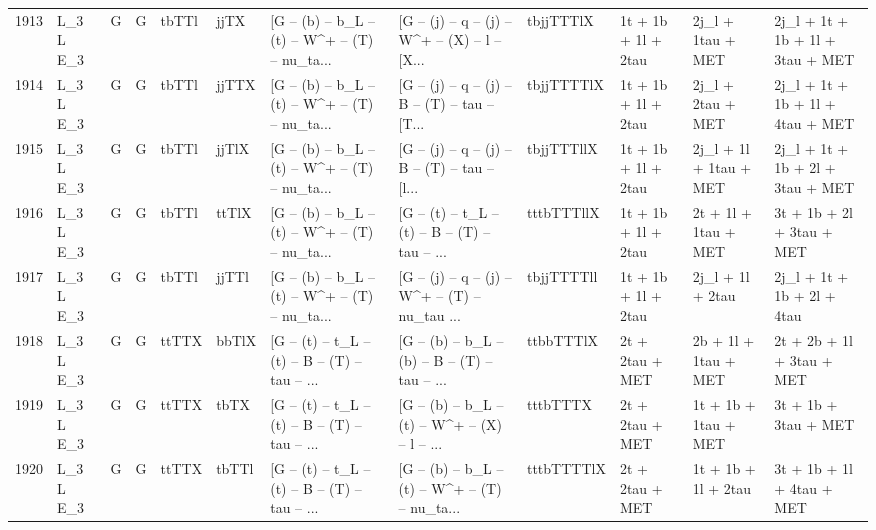 \begin{tabular}{llllllllllll}
1913 &    L\_3 L E\_3 &     G &     G &       tbTTl &        jjTX &  [G -- (b) -- b\_L -- (t) -- W\textasciicircum + -- (T) -- nu\_ta... &  [G -- (j) -- q -- (j) -- W\textasciicircum + -- (X) -- l -- [X... &   tbjjTTTlX &      1t + 1b + 1l + 2tau &        2j\_l + 1tau + MET &   2j\_l + 1t + 1b + 1l + 3tau + MET \\
1914 &    L\_3 L E\_3 &     G &     G &       tbTTl &       jjTTX &  [G -- (b) -- b\_L -- (t) -- W\textasciicircum + -- (T) -- nu\_ta... &  [G -- (j) -- q -- (j) -- B -- (T) -- tau -- [T... &  tbjjTTTTlX &      1t + 1b + 1l + 2tau &        2j\_l + 2tau + MET &   2j\_l + 1t + 1b + 1l + 4tau + MET \\
1915 &    L\_3 L E\_3 &     G &     G &       tbTTl &       jjTlX &  [G -- (b) -- b\_L -- (t) -- W\textasciicircum + -- (T) -- nu\_ta... &  [G -- (j) -- q -- (j) -- B -- (T) -- tau -- [l... &  tbjjTTTllX &      1t + 1b + 1l + 2tau &   2j\_l + 1l + 1tau + MET &   2j\_l + 1t + 1b + 2l + 3tau + MET \\
1916 &    L\_3 L E\_3 &     G &     G &       tbTTl &       ttTlX &  [G -- (b) -- b\_L -- (t) -- W\textasciicircum + -- (T) -- nu\_ta... &  [G -- (t) -- t\_L -- (t) -- B -- (T) -- tau -- ... &  tttbTTTllX &      1t + 1b + 1l + 2tau &     2t + 1l + 1tau + MET &          3t + 1b + 2l + 3tau + MET \\
1917 &    L\_3 L E\_3 &     G &     G &       tbTTl &       jjTTl &  [G -- (b) -- b\_L -- (t) -- W\textasciicircum + -- (T) -- nu\_ta... &  [G -- (j) -- q -- (j) -- W\textasciicircum + -- (T) -- nu\_tau ... &  tbjjTTTTll &      1t + 1b + 1l + 2tau &         2j\_l + 1l + 2tau &         2j\_l + 1t + 1b + 2l + 4tau \\
1918 &    L\_3 L E\_3 &     G &     G &       ttTTX &       bbTlX &  [G -- (t) -- t\_L -- (t) -- B -- (T) -- tau -- ... &  [G -- (b) -- b\_L -- (b) -- B -- (T) -- tau -- ... &   ttbbTTTlX &          2t + 2tau + MET &     2b + 1l + 1tau + MET &          2t + 2b + 1l + 3tau + MET \\
1919 &    L\_3 L E\_3 &     G &     G &       ttTTX &        tbTX &  [G -- (t) -- t\_L -- (t) -- B -- (T) -- tau -- ... &  [G -- (b) -- b\_L -- (t) -- W\textasciicircum + -- (X) -- l -- ... &    tttbTTTX &          2t + 2tau + MET &     1t + 1b + 1tau + MET &               3t + 1b + 3tau + MET \\
1920 &    L\_3 L E\_3 &     G &     G &       ttTTX &       tbTTl &  [G -- (t) -- t\_L -- (t) -- B -- (T) -- tau -- ... &  [G -- (b) -- b\_L -- (t) -- W\textasciicircum + -- (T) -- nu\_ta... &  tttbTTTTlX &          2t + 2tau + MET &      1t + 1b + 1l + 2tau &          3t + 1b + 1l + 4tau + MET \\

\end{tabular}
